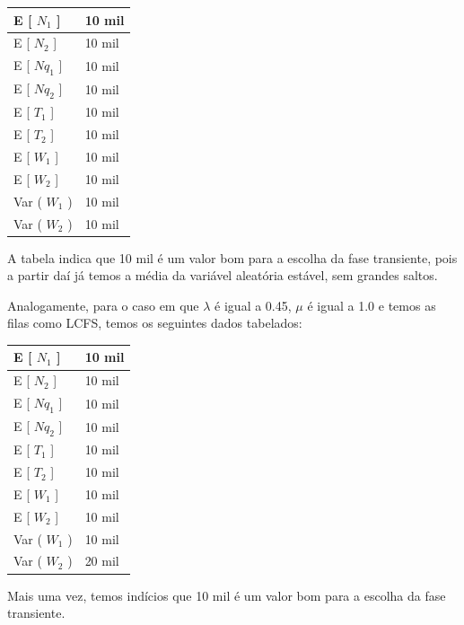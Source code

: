 \documentclass[a4paper,10pt]{article}
\begin{document}
\begin{center}
\begin{tabular} { | l | l | }
    \hline
    E [ $N_1$ ]  & 10 mil \\ \hline
    E [ $N_2$ ] & 10 mil \\ \hline
    E [ $Nq_1$ ] & 10 mil \\ \hline
    E [ $Nq_2$ ]	& 10 mil \\ \hline
    E [ $T_1$ ] & 10 mil \\ \hline
    E [ $T_2$ ] & 10 mil \\ \hline
    E [ $W_1$ ] & 10 mil \\ \hline
    E [ $W_2$ ] & 10 mil \\ \hline
    Var ( $W_1$ ) & 10 mil \\ \hline
    Var ( $W_2$ ) & 10 mil \\ \hline
\end{tabular}
\end{center}

    A tabela indica que 10 mil é um valor bom para a escolha da fase transiente, pois a partir daí já temos a média da variável aleatória estável, sem grandes saltos.

    Analogamente, para o caso em que $\lambda$ é igual a 0.45, $\mu$ é igual a 1.0 e temos as filas como LCFS, temos os seguintes dados tabelados:

\begin{center}
\begin{tabular} { | l | l | }
    \hline
    E [ $N_1$ ]  & 10 mil \\ \hline
    E [ $N_2$ ] & 10 mil \\ \hline
    E [ $Nq_1$ ] & 10 mil \\ \hline
    E [ $Nq_2$ ]	& 10 mil \\ \hline
    E [ $T_1$ ] & 10 mil \\ \hline
    E [ $T_2$ ] & 10 mil \\ \hline
    E [ $W_1$ ] & 10 mil \\ \hline
    E [ $W_2$ ] & 10 mil \\ \hline
    Var ( $W_1$ ) & 10 mil \\ \hline
    Var ( $W_2$ ) & 20 mil \\ \hline
\end{tabular}
\end{center}

    Mais uma vez, temos indícios que 10 mil é um valor bom para a escolha da fase transiente.
\end{document}
